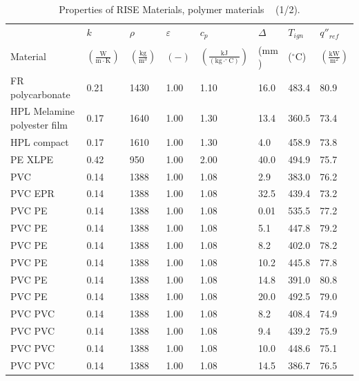 \clearpage

\begin{table}[!h]
\caption[Properties of RISE Materials, polymer materials]{Properties of RISE Materials, polymer materials ~\cite{RISE:Fire_Database} (1/2).}
\centering
\begin{tabular}{|p{5.5cm}|p{1.0cm}|p{1.0cm}|p{0.8cm}|p{1.4cm}|p{1.0cm}|p{1.0cm}|p{1.2cm}|}
\hline
                                               & $k$    & $\rho$      & $\varepsilon$   & $c_{p}$ & $\Delta$    & $T_{ign}$ & $q''_{ref}$ \\
Material                                       & $\mathrm{\left(\frac{W}{m\cdot K}\right)}$ & $\mathrm{\left(\frac{kg}{m^{3}}\right)}$ & $\mathrm{( - )}$ & $\mathrm{\left(\frac{kJ}{(kg\cdot ^{\circ}C)}\right)}$ &  ($\mathrm{mm}$)   & ($\mathrm{^{\circ}C}$) & $\mathrm{\left(\frac{kW}{m^{2}}\right)}$ \\ \hline
\hline
FR polycarbonate & 0.21 & 1430 & 1.00 & 1.10 & 16.0 & 483.4 & 80.9 \\ \hline
HPL Melamine polyester film  & 0.17 & 1640 & 1.00 & 1.30 & 13.4 & 360.5 & 73.4 \\ \hline
HPL compact  & 0.17 & 1610 & 1.00 & 1.30 & 4.0 & 458.9 & 73.8 \\ \hline
PE XLPE & 0.42 & 950 & 1.00 & 2.00 & 40.0 & 494.9 & 75.7 \\ \hline
PVC & 0.14 & 1388 & 1.00 & 1.08 & 2.9 & 383.0 & 76.2 \\ \hline
PVC EPR & 0.14 & 1388 & 1.00 & 1.08 & 32.5 & 439.4 & 73.2 \\ \hline
PVC PE & 0.14 & 1388 & 1.00 & 1.08 & 0.01 & 535.5 & 77.2 \\ \hline
PVC PE & 0.14 & 1388 & 1.00 & 1.08 & 5.1 & 447.8 & 79.2 \\ \hline
PVC PE & 0.14 & 1388 & 1.00 & 1.08 & 8.2 & 402.0 & 78.2 \\ \hline
PVC PE & 0.14 & 1388 & 1.00 & 1.08 & 10.2 & 445.8 & 77.8 \\ \hline
PVC PE & 0.14 & 1388 & 1.00 & 1.08 & 14.8 & 391.0 & 80.8 \\ \hline
PVC PE & 0.14 & 1388 & 1.00 & 1.08 & 20.0 & 492.5 & 79.0 \\ \hline
PVC PVC & 0.14 & 1388 & 1.00 & 1.08 & 8.2 & 408.4 & 74.9 \\ \hline
PVC PVC & 0.14 & 1388 & 1.00 & 1.08 & 9.4 & 439.2 & 75.9 \\ \hline
PVC PVC & 0.14 & 1388 & 1.00 & 1.08 & 10.0 & 448.6 & 75.1 \\ \hline
PVC PVC & 0.14 & 1388 & 1.00 & 1.08 & 14.5 & 386.7 & 76.5 \\ \hline

\end{tabular}
\end{table}
